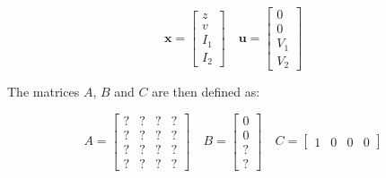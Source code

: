 \begin{equation}
    \mathbf{x} = \begin{bmatrix}
        z   \\
        v   \\
        I_1 \\
        I_2
    \end{bmatrix}
    \quad
    \mathbf{u} = \begin{bmatrix}
        0   \\
        0   \\
        V_1 \\
        V_2
    \end{bmatrix}
\end{equation}

The matrices $A$, $B$ and $C$ are then defined as:

\begin{equation}
    A = \begin{bmatrix}
        ? & ? & ? & ? \\
        ? & ? & ? & ? \\
        ? & ? & ? & ? \\
        ? & ? & ? & ?
    \end{bmatrix}
    \quad
    B = \begin{bmatrix}
        0 \\
        0 \\
        ? \\
        ?
    \end{bmatrix}
    \quad
    C = \begin{bmatrix}
        1 & 0 & 0 & 0
    \end{bmatrix}
\end{equation}
